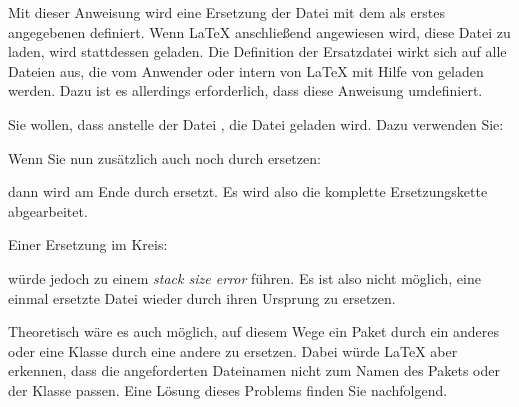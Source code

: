 \begin{Declaration}[0]
\end{Declaration}
Mit dieser Anweisung wird eine Ersetzung
der Datei mit dem als erstes angegebenen  definiert. Wenn
\LaTeX{} anschließend angewiesen wird, diese Datei zu laden, wird stattdessen
 geladen. Die Definition der Ersatzdatei wirkt sich auf
alle Dateien aus, die vom Anwender oder intern von \LaTeX{} mit Hilfe von
 geladen werden. Dazu ist es allerdings erforderlich,
dass  diese Anweisung umdefiniert.

\begin{Example}
  Sie wollen, dass anstelle der Datei , die Datei
   geladen wird. Dazu verwenden Sie:
\begin{lstcode}
\end{lstcode}
  Wenn Sie nun zusätzlich  auch noch durch
   ersetzen:
\begin{lstcode}
\end{lstcode}
  dann wird  am Ende durch
   ersetzt. Es wird also die komplette
  Ersetzungskette abgearbeitet.

  Einer Ersetzung im Kreis:
\begin{lstcode}
\end{lstcode}
  würde jedoch zu einem \emph{stack size error} führen. Es ist also nicht
  möglich, eine einmal ersetzte Datei wieder durch ihren Ursprung zu ersetzen.
\end{Example}

Theoretisch wäre es auch möglich, auf diesem Wege ein Paket durch ein anderes
oder eine Klasse durch eine andere zu ersetzen. Dabei würde \LaTeX{} aber
erkennen, dass die angeforderten Dateinamen nicht zum Namen des Pakets oder
der Klasse passen. Eine Lösung dieses Problems finden Sie nachfolgend.
%
\EndIndexGroup


